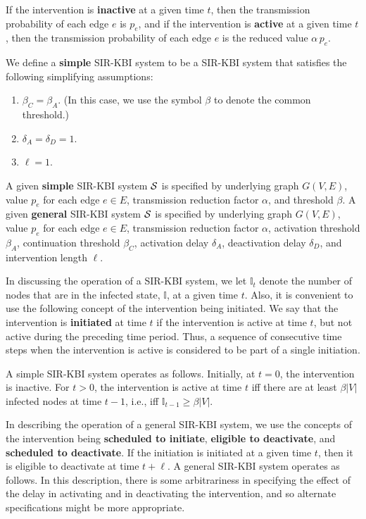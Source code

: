 \documentclass[11pt]{article}
\newcommand{\cals}{\mbox{${\cal S}$}}
\newcommand{\istate}{\mbox{$\mathbb{I}$}}
\begin{document}
If the intervention is {\bf inactive} at a given time $t$,
then  the transmission probability of each edge $e$ is $p_e$,
and if the intervention is {\bf active} at a given time $t$,
then  the transmission probability of each edge $e$ is the reduced value $\alpha \, p_e$.

We define a {\bf simple} SIR-KBI system to be a SIR-KBI system that satisfies 
the following simplifying assumptions:
\begin{enumerate}
\item
$\beta_C = \beta_A$. (In this case, we use the symbol $\beta$ to denote the common threshold.)
\item
$\delta_A = \delta_D = 1$.
\item
$\ell = 1$.
\end{enumerate}

A given {\bf simple} SIR-KBI system \cals{} is specified by underlying graph $G(V,E)$, 
value $p_e$ for each edge $e \in E$,
transmission reduction factor $\alpha$, and threshold $\beta$.
A given {\bf general} SIR-KBI system \cals{} is specified by underlying graph $G(V,E)$, 
value $p_e$ for each edge $e \in E$,
transmission reduction factor $\alpha$, activation threshold $\beta_A$, 
continuation threshold $\beta_C$,
activation delay $\delta_A$, 
deactivation delay $\delta_D$, 
and intervention length $\ell$.

In discussing the operation of a SIR-KBI system, we let $\istate_t$
denote the number of nodes that are in the infected state, \istate, at a given time $t$.
Also, it is convenient to use the following concept of the intervention being initiated.
We say that the intervention is {\bf initiated} at time $t$ if the intervention is active at time $t$,
but not active during the preceding time period.
Thus, a sequence of consecutive time steps when the intervention is active is considered to be 
part of a single initiation.

A simple SIR-KBI system operates as follows.
Initially, at $t = 0$, the intervention is inactive.
For $t > 0$, the intervention is active at time $t$
iff there are at least $\beta |V|$ infected nodes at time $t-1$,
i.e., iff $\istate_{t-1} \geq \beta |V|$.

In describing the operation of a general SIR-KBI system,
we use the concepts of the intervention being {\bf scheduled to initiate},
{\bf eligible to deactivate}, and {\bf scheduled to deactivate}.
If the initiation is initiated at a given time $t$, then it is eligible to deactivate at time $t + \ell$.
A general SIR-KBI system operates as follows.
In this description, there is some arbitrariness in specifying the effect of the delay 
in activating and in deactivating the intervention, 
and so alternate specifications might be more appropriate.
\end{document}
